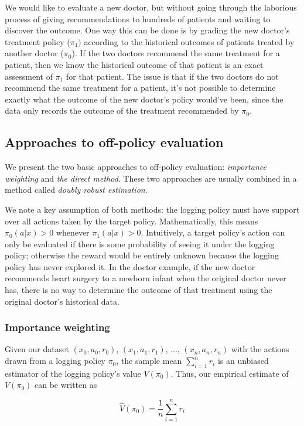\documentclass[sigplan,screen]{acmart}
\begin{document}
We would like to evaluate a new doctor, but without going through the laborious process of giving recommendations to hundreds of patients and waiting to discover the outcome. One way this can be done is by grading the new doctor's treatment policy ($\pi_1)$ according to the historical outcomes of patients treated by another doctor ($\pi_0$). If the two doctors recommend the same treatment for a patient, then we know the historical outcome of that patient is an exact assessment of $\pi_1$ for that patient. The issue is that if the two doctors do not recommend the same treatment for a patient, it's not possible to determine exactly what the outcome of the new doctor's policy would've been, since the data only records the outcome of the treatment recommended by $\pi_0$.

\subsection{Approaches to off-policy evaluation}
We present the two basic approaches to off-policy evaluation: \textit{importance weighting} and \textit{the direct method}. These two approaches are usually combined in a method called \textit{doubly robust estimation}.

We note a key assumption of both methods: the logging policy must have support over all actions taken by the target policy. Mathematically, this means $\pi_0(a|x) > 0$ whenever $\pi_1(a|x) > 0$. Intuitively, a target policy's action can only be evaluated if there is some probability of seeing it under the logging policy; otherwise the reward would be entirely unknown because the logging policy has never explored it. In the doctor example, if the new doctor recommends heart surgery to a newborn infant when the original doctor never has, there is no way to determine the outcome of that treatment using the original doctor's historical data.

\subsubsection{Importance weighting}
Given our dataset $(x_0, a_0, r_0)$, $(x_1, a_1, r_1)$, ..., $(x_n, a_n, r_n)$ with the actions drawn from a logging policy $\pi_0$, the sample mean $\sum_{i=1}^n r_i$ is an unbiased estimator of the logging policy's value $V(\pi_0)$. Thus, our empirical estimate of $V(\pi_0)$ can be written as 

\begin{equation}
    \hat{V}(\pi_0) = \dfrac{1}{n} \sum_{i=1}^n r_i
\end{equation}
\end{document}
